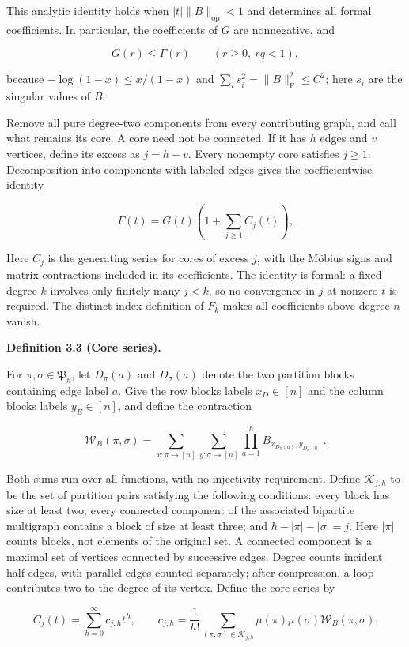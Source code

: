 \documentclass[11pt,a4paper]{article}
\begin{document}
This analytic identity holds when \(|t|\|B\|_{\mathrm{op}}<1\) and determines all formal coefficients. In particular, the coefficients of \(G\) are nonnegative, and

\[
G(r)\le\Gamma(r)\qquad(r\ge0,\ rq<1),
\]

because \(-\log(1-x)\le x/(1-x)\) and \(\sum_i s_i^2=\|B\|_{\mathrm F}^2\le C^2\); here \(s_i\) are the singular values of \(B\).

Remove all pure degree-two components from every contributing graph, and call what remains its core. A core need not be connected. If it has \(h\) edges and \(v\) vertices, define its excess as \(j=h-v\). Every nonempty core satisfies \(j\ge1\). Decomposition into components with labeled edges gives the coefficientwise identity

\[
F(t)=G(t)\left(1+\sum_{j\ge1}C_j(t)\right),
\]

Here \(C_j\) is the generating series for cores of excess \(j\), with the Möbius signs and matrix contractions included in its coefficients. The identity is formal: a fixed degree \(k\) involves only finitely many \(j<k\), so no convergence in \(j\) at nonzero \(t\) is required. The distinct-index definition of \(F_k\) makes all coefficients above degree \(n\) vanish.

\textbf{Definition 3.3 (Core series).}

For \(\pi,\sigma\in\mathfrak P_h\), let \(D_\pi(a)\) and \(D_\sigma(a)\) denote the two partition blocks containing edge label \(a\). Give the row blocks labels \(x_D\in[n]\) and the column blocks labels \(y_E\in[n]\), and define the contraction

\[
\mathcal W_B(\pi,\sigma)
=\sum_{x:\pi\to[n]}\sum_{y:\sigma\to[n]}
\prod_{a=1}^hB_{x_{D_\pi(a)},y_{D_\sigma(a)}}.
\]

Both sums run over all functions, with no injectivity requirement. Define \(\mathcal K_{j,h}\) to be the set of partition pairs satisfying the following conditions: every block has size at least two; every connected component of the associated bipartite multigraph contains a block of size at least three; and \(h-|\pi|-|\sigma|=j\). Here \(|\pi|\) counts blocks, not elements of the original set. A connected component is a maximal set of vertices connected by successive edges. Degree counts incident half-edges, with parallel edges counted separately; after compression, a loop contributes two to the degree of its vertex. Define the core series by

\[
C_j(t)=\sum_{h=0}^{\infty}c_{j,h}t^h,\qquad
c_{j,h}=\frac1{h!}\sum_{(\pi,\sigma)\in\mathcal K_{j,h}}
\mu(\pi)\mu(\sigma)\mathcal W_B(\pi,\sigma).
\]
\end{document}
